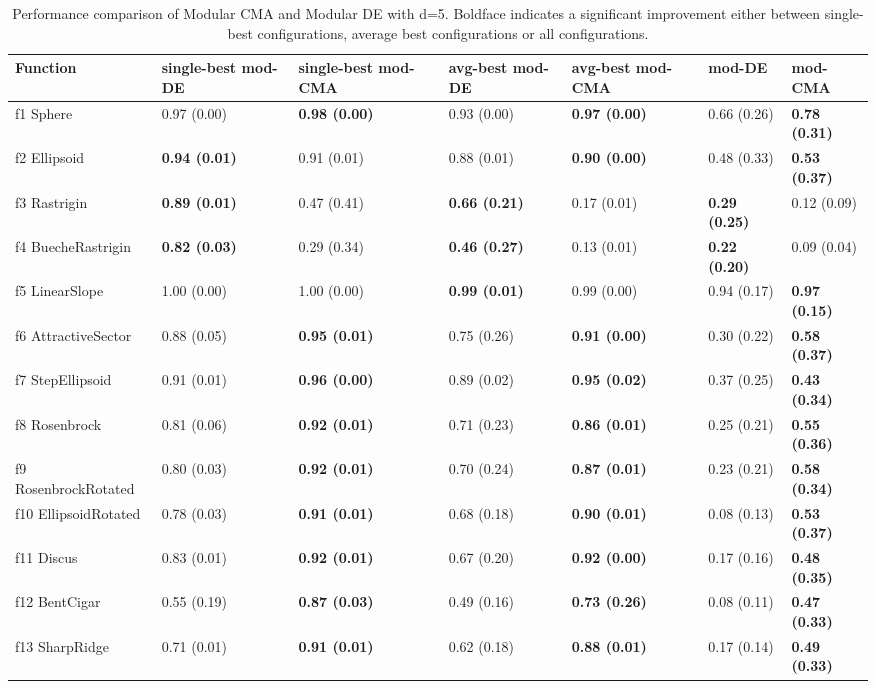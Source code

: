 \begin{table}
\caption{Performance comparison of Modular CMA and Modular DE with d=5. Boldface indicates a significant improvement either between single-best configurations, average best configurations or all configurations.}
\begin{tabular}{lllllll}
\toprule
Function & single-best mod-DE & single-best mod-CMA & avg-best mod-DE & avg-best mod-CMA & mod-DE & mod-CMA \\
\midrule
f1 Sphere & 0.97 (0.00) & \textbf{0.98 (0.00)} & 0.93 (0.00) & \textbf{0.97 (0.00)} & 0.66 (0.26) & \textbf{0.78 (0.31)} \\
f2 Ellipsoid & \textbf{0.94 (0.01)} & 0.91 (0.01) & 0.88 (0.01) & \textbf{0.90 (0.00)} & 0.48 (0.33) & \textbf{0.53 (0.37)} \\
f3 Rastrigin & \textbf{0.89 (0.01)} & 0.47 (0.41) & \textbf{0.66 (0.21)} & 0.17 (0.01) & \textbf{0.29 (0.25)} & 0.12 (0.09) \\
f4 BuecheRastrigin & \textbf{0.82 (0.03)} & 0.29 (0.34) & \textbf{0.46 (0.27)} & 0.13 (0.01) & \textbf{0.22 (0.20)} & 0.09 (0.04) \\
f5 LinearSlope & 1.00 (0.00) & 1.00 (0.00) & \textbf{0.99 (0.01)} & 0.99 (0.00) & 0.94 (0.17) & \textbf{0.97 (0.15)} \\
f6 AttractiveSector & 0.88 (0.05) & \textbf{0.95 (0.01)} & 0.75 (0.26) & \textbf{0.91 (0.00)} & 0.30 (0.22) & \textbf{0.58 (0.37)} \\
f7 StepEllipsoid & 0.91 (0.01) & \textbf{0.96 (0.00)} & 0.89 (0.02) & \textbf{0.95 (0.02)} & 0.37 (0.25) & \textbf{0.43 (0.34)} \\
f8 Rosenbrock & 0.81 (0.06) & \textbf{0.92 (0.01)} & 0.71 (0.23) & \textbf{0.86 (0.01)} & 0.25 (0.21) & \textbf{0.55 (0.36)} \\
f9 RosenbrockRotated & 0.80 (0.03) & \textbf{0.92 (0.01)} & 0.70 (0.24) & \textbf{0.87 (0.01)} & 0.23 (0.21) & \textbf{0.58 (0.34)} \\
f10 EllipsoidRotated & 0.78 (0.03) & \textbf{0.91 (0.01)} & 0.68 (0.18) & \textbf{0.90 (0.01)} & 0.08 (0.13) & \textbf{0.53 (0.37)} \\
f11 Discus & 0.83 (0.01) & \textbf{0.92 (0.01)} & 0.67 (0.20) & \textbf{0.92 (0.00)} & 0.17 (0.16) & \textbf{0.48 (0.35)} \\
f12 BentCigar & 0.55 (0.19) & \textbf{0.87 (0.03)} & 0.49 (0.16) & \textbf{0.73 (0.26)} & 0.08 (0.11) & \textbf{0.47 (0.33)} \\
f13 SharpRidge & 0.71 (0.01) & \textbf{0.91 (0.01)} & 0.62 (0.18) & \textbf{0.88 (0.01)} & 0.17 (0.14) & \textbf{0.49 (0.33)} \\

\end{tabular}
\end{table}
